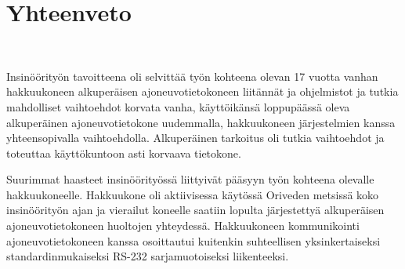 


\newpage

\chapter{Yhteenveto}\


Insinöörityön tavoitteena oli selvittää työn kohteena olevan 17 vuotta vanhan hakkuukoneen alkuperäisen ajoneuvotietokoneen liitännät ja ohjelmistot ja tutkia mahdolliset vaihtoehdot korvata vanha, käyttöikänsä loppupäässä oleva alkuperäinen ajoneuvotietokone uudemmalla, hakkuukoneen järjestelmien kanssa yhteensopivalla vaihtoehdolla. Alkuperäinen tarkoitus oli tutkia vaihtoehdot ja toteuttaa käyttökuntoon asti korvaava tietokone.

Suurimmat haasteet insinöörityössä liittyivät pääsyyn työn kohteena olevalle hakkuukoneelle. Hakkuukone oli aktiivisessa käytössä Oriveden metsissä koko insinöörityön ajan ja vierailut koneelle saatiin lopulta järjestettyä alkuperäisen ajoneuvotietokoneen huoltojen yhteydessä. Hakkuukoneen kommunikointi ajoneuvotietokoneen kanssa osoittautui kuitenkin suhteellisen yksinkertaiseksi standardinmukaiseksi RS-232 sarjamuotoiseksi liikenteeksi.

